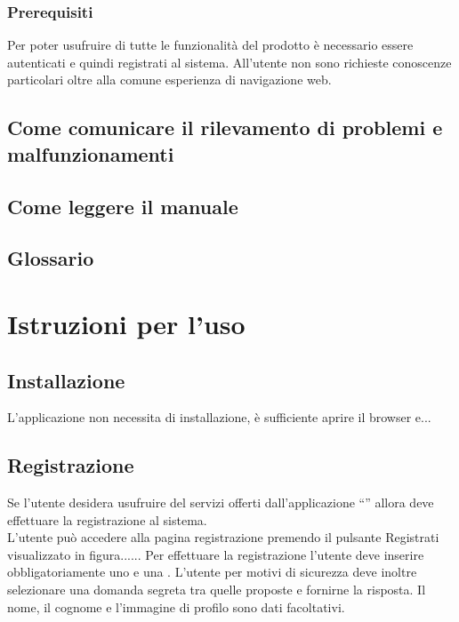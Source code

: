  
\subsubsection{Prerequisiti}
Per poter usufruire di tutte le funzionalità del prodotto è necessario essere autenticati e quindi registrati al sistema.
All'utente non sono richieste conoscenze particolari oltre alla comune esperienza
di navigazione web.

\subsection{Come comunicare il rilevamento di problemi e malfunzionamenti}


\subsection{Come leggere il manuale}

\subsection{Glossario}
\glossaryIntro


\section{Istruzioni per l'uso}

\subsection{Installazione}
L'applicazione non necessita di installazione, è sufficiente aprire il browser e...
\subsection{Registrazione}
Se l'utente desidera usufruire del servizi offerti dall'applicazione ``\caName'' allora deve effettuare la registrazione al sistema.\\
L'utente può accedere alla pagina registrazione premendo il pulsante Registrati visualizzato in figura......
Per effettuare la registrazione l'utente deve inserire obbligatoriamente uno  e una .
L'utente per motivi di sicurezza deve inoltre selezionare una domanda segreta tra quelle proposte e fornirne la risposta.
Il nome, il cognome e l'immagine di profilo sono dati facoltativi.

